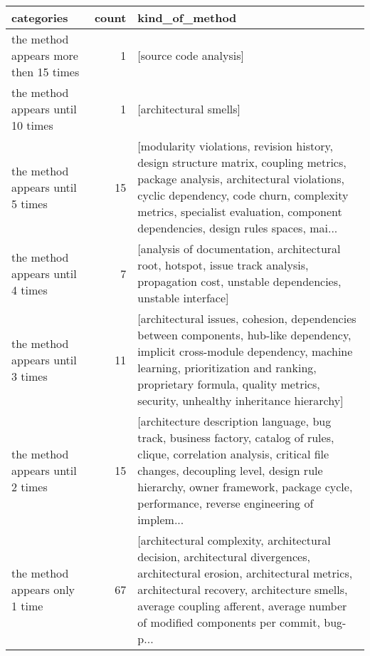 \begin{tabular}{lrl}
\toprule
                            categories &  count &                                                                                                                                                                                                                                                  kind\_of\_method \\
\midrule
 the method appears more then 15 times &      1 &                                                                                                                                                                                                                                          [source code analysis] \\
     the method appears until 10 times &      1 &                                                                                                                                                                                                                                          [architectural smells] \\
      the method appears until 5 times &     15 &  [modularity violations, revision history, design structure matrix, coupling metrics, package analysis, architectural violations, cyclic dependency, code churn, complexity metrics, specialist evaluation, component dependencies, design rules spaces, mai... \\
      the method appears until 4 times &      7 &                                                                                                                     [analysis of documentation, architectural root, hotspot, issue track analysis, propagation cost, unstable dependencies, unstable interface] \\
      the method appears until 3 times &     11 &         [architectural issues, cohesion, dependencies between components, hub-like dependency, implicit cross-module dependency, machine learning, prioritization and ranking, proprietary formula, quality metrics, security, unhealthy inheritance hierarchy] \\
      the method appears until 2 times &     15 &  [architecture description language, bug track, business factory, catalog of rules, clique, correlation analysis, critical file changes, decoupling level, design rule hierarchy, owner framework, package cycle, performance, reverse engineering of implem... \\
        the method appears only 1 time &     67 &  [architectural complexity, architectural decision, architectural divergences, architectural erosion, architectural metrics, architectural recovery, architecture smells, average coupling afferent, average number of modified components per commit, bug-p... \\
\bottomrule
\end{tabular}
